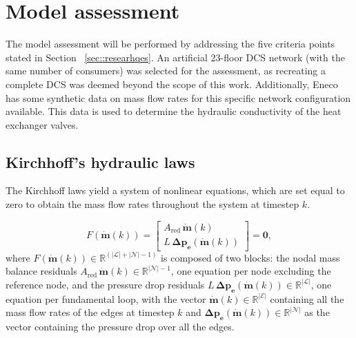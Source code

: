 

\section{Model assessment}
The model assessment will be performed by addressing the five criteria points stated in Section ~\eqref{sec::researhqes}. An artificial 23-floor DCS network (with the same number of consumers) was selected for the assessment, as recreating a complete DCS was deemed beyond the scope of this work. Additionally, Eneco has some synthetic data on mass flow rates for this specific network configuration available. This data is used to determine the hydraulic conductivity of the heat exchanger valves. 


\subsection{Kirchhoff's hydraulic laws}
The Kirchhoff laws yield a system of nonlinear equations, which are set equal to zero to obtain the mass flow rates throughout the system at timestep $k$.

\begin{equation}\label{eq::KirchoffNR}
F(\dot{\mathbf{m}}(k)) = 
\begin{bmatrix}
    A_{\text{red}}\, \dot{\mathbf{m}}(k) \\[6pt]
    L \, \mathbf{\Delta p_e} (\dot{\mathbf{m}}(k))
\end{bmatrix}
= \mathbf{0},
\end{equation}
where $F(\dot{\mathbf{m}}(k)) \in \mathbb{R}^{(|\mathcal{L}|+|\mathcal{N}|-1)}$ is composed of two blocks: the nodal mass balance residuals $A_{\text{red}}\,\dot{\mathbf{m}}(k) \in \mathbb{R}^{|\mathcal{N}|-1}$, one equation per node excluding the reference node, and the pressure drop residuals $L \, \mathbf{\Delta p_e} (\dot{\mathbf{m}}(k)) \in \mathbb{R}^{|\mathcal{L}|}$, one equation per fundamental loop, with the vector $\dot{\mathbf{m}}(k) \in \mathbb{R}^{|\mathcal{E}|}$ containing all the mass flow rates of the edges at timestep $k$ and $\mathbf{\Delta p_e} (\dot{\mathbf{m}}(k)) \in \mathbb{R}^{|\mathcal{N}|}$ as the vector containing the pressure drop over all the edges. 

